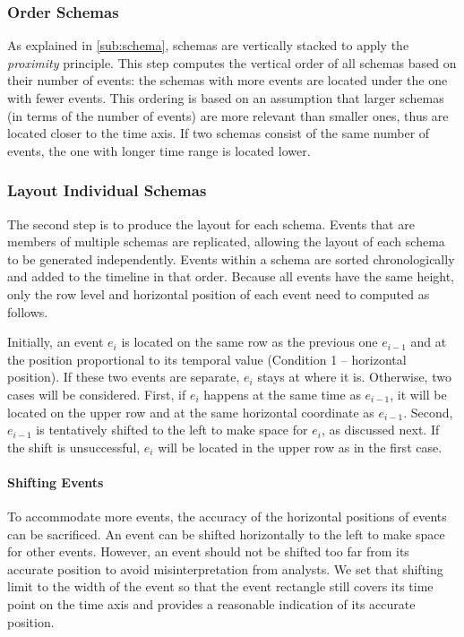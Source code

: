 \subsubsection{Order Schemas}
As explained in \autoref{sub:schema}, schemas are vertically stacked to apply the \emph{proximity} principle. This step computes the vertical order of all schemas based on their number of events: the schemas with more events are located under the one with fewer events. This ordering is based on an assumption that larger schemas (in terms of the number of events) are more relevant than smaller ones, thus are located closer to the time axis. If two schemas consist of the same number of events, the one with longer time range is located lower.

\subsubsection{Layout Individual Schemas}
\label{sub:layout-schema}
The second step is to produce the layout for each schema. Events that are members of multiple schemas are replicated, allowing the layout of each schema to be generated independently. Events within a schema are sorted chronologically and added to the timeline in that order. Because all events have the same height, only the row level and horizontal position of each event need to computed as follows.

Initially, an event $e_i$ is located on the same row as the previous one $e_{i-1}$ and at the position proportional to its temporal value (Condition 1 -- horizontal position). If these two events are separate, $e_i$ stays at where it is. Otherwise, two cases will be considered. First, if $e_i$ happens at the same time as $e_{i-1}$, it will be located on the upper row and at the same horizontal coordinate as $e_{i-1}$. Second, $e_{i-1}$ is tentatively shifted to the left to make space for $e_i$, as discussed next. If the shift is unsuccessful, $e_i$ will be located in the upper row as in the first case.

\paragraph*{Shifting Events}
To accommodate more events, the accuracy of the horizontal positions of events can be sacrificed. An event can be shifted horizontally to the left to make space for other events. However, an event should not be shifted too far from its accurate position to avoid misinterpretation from analysts. We set that shifting limit to the width of the event so that the event rectangle still covers its time point on the time axis and provides a reasonable indication of its accurate position.

